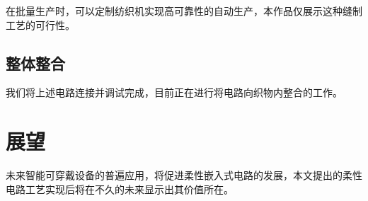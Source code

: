 在批量生产时，可以定制纺织机实现高可靠性的自动生产，本作品仅展示这种缝制工艺的可行性。


\section{整体整合}

我们将上述电路连接并调试完成，目前正在进行将电路向织物内整合的工作。



\chapter{展望}
未来智能可穿戴设备的普遍应用，将促进柔性嵌入式电路的发展，本文提出的柔性电路工艺实现后将在不久的未来显示出其价值所在。

